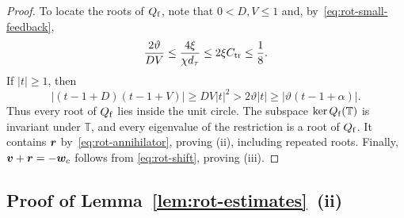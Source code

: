 \begin{proof}
To locate the roots of \(Q_{\rm f}\), note that
\(0<D,V\le1\) and, by~\eqref{eq:rot-small-feedback},
\[
\frac{2\vartheta}{DV}\le\frac{4\xi}{\chi d_\tau}
\le2\xi C_{\rm tr}\le\frac18.
\]
If \(|t|\ge1\), then
\[
|(t-1+D)(t-1+V)|\ge DV|t|^2
>2\vartheta|t|\ge|\vartheta(t-1+\alpha)|.
\]
Thus every root of \(Q_{\rm f}\) lies inside the unit circle.
The subspace \(\ker Q_{\rm f}(\mathbb T)\) is invariant under \(\mathbb T\),
and every eigenvalue of the restriction is a root of \(Q_{\rm f}\).
It contains \(\bm{r}\) by~\eqref{eq:rot-annihilator}, proving (ii), including
repeated roots. Finally, \(\bm{v}+\bm{r}=-\bm{w}_c\) follows from
\eqref{eq:rot-shift}, proving (iii).
\end{proof}

\subsection{Proof of Lemma~\ref{lem:rot-estimates}~(ii)}
\label{app:lb-rotation-transient-proof}
